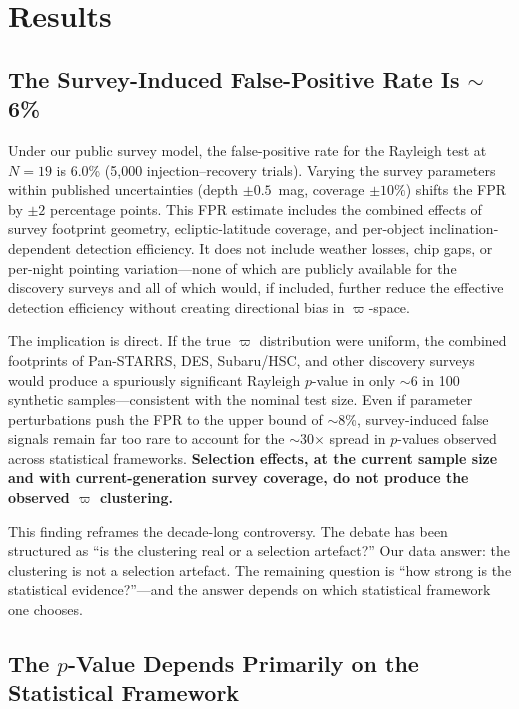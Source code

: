 \documentclass[12pt,a4paper]{article}
\begin{document}
\section{Results}

\subsection{The Survey-Induced False-Positive Rate Is $\sim$6\%}

Under our public survey model, the false-positive rate for the Rayleigh test at $N=19$ is 6.0\% (5,000 injection--recovery trials). Varying the survey parameters within published uncertainties (depth $\pm0.5$~mag, coverage $\pm10\%$) shifts the FPR by $\pm2$ percentage points. This FPR estimate includes the combined effects of survey footprint geometry, ecliptic-latitude coverage, and per-object inclination-dependent detection efficiency. It does not include weather losses, chip gaps, or per-night pointing variation---none of which are publicly available for the discovery surveys and all of which would, if included, further reduce the effective detection efficiency without creating directional bias in $\varpi$-space.

The implication is direct. If the true $\varpi$ distribution were uniform, the combined footprints of Pan-STARRS, DES, Subaru/HSC, and other discovery surveys would produce a spuriously significant Rayleigh $p$-value in only $\sim$6 in 100 synthetic samples---consistent with the nominal test size. Even if parameter perturbations push the FPR to the upper bound of $\sim$8\%, survey-induced false signals remain far too rare to account for the $\sim$30$\times$ spread in $p$-values observed across statistical frameworks. \textbf{Selection effects, at the current sample size and with current-generation survey coverage, do not produce the observed $\varpi$ clustering.}

This finding reframes the decade-long controversy. The debate has been structured as ``is the clustering real or a selection artefact?'' Our data answer: the clustering is not a selection artefact. The remaining question is ``how strong is the statistical evidence?''---and the answer depends on which statistical framework one chooses.

\subsection{The $p$-Value Depends Primarily on the Statistical Framework}
\end{document}
